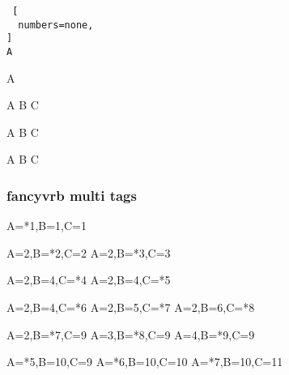 
\begin{Verbatim} [
  numbers=none,
]
A
\end{Verbatim}

\begin{CDRBlock} [
  tags=none,
  numbers=none,
]
A
\end{CDRBlock}
\begin{CDRBlock} [
  tags=none,
  numbers=left,
  firstnumber=last,
]
A
B
C
\end{CDRBlock}
\begin{CDRBlock} [
  tags=none,
  numbers=left,
  firstnumber=last,
]
A
B
C
\end{CDRBlock}
\begin{CDRBlock} [
  tags=none,
  numbers=left,
  firstnumber=last,
]
A
B
C
\end{CDRBlock}

\subsubsection{\textsf{fancyvrb} multi tags}


\begin{CDRBlock} [
  tags={A,B,C},
  numbers=left,
  firstnumber=last,
]
A=*1,B=1,C=1
\end{CDRBlock}
\begin{CDRBlock} [
  tags={B,C},
  numbers=left,
  firstnumber=last,
]
A=2,B=*2,C=2
A=2,B=*3,C=3
\end{CDRBlock}

\begin{CDRBlock} [
  tags=C,
  numbers=left,
  firstnumber=last,
]
A=2,B=4,C=*4
A=2,B=4,C=*5
\end{CDRBlock}

\begin{CDRBlock} [
  tags={C, B},
  numbers=left,
  firstnumber=last,
]
A=2,B=4,C=*6
A=2,B=5,C=*7
A=2,B=6,C=*8
\end{CDRBlock}

\begin{CDRBlock} [
  tags={B, A},
  numbers=left,
  firstnumber=last,
]
A=2,B=*7,C=9
A=3,B=*8,C=9
A=4,B=*9,C=9
\end{CDRBlock}
\begin{CDRBlock} [
  tags={A,C},
  numbers=left,
  firstnumber=last,
]
A=*5,B=10,C=9
A=*6,B=10,C=10
A=*7,B=10,C=11
\end{CDRBlock}

